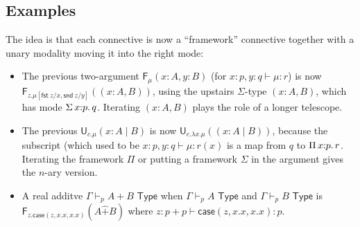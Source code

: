 \documentclass[10pt]{article}
\newcommand\dsd[1]{\ensuremath{\mathsf{#1}}}
\newcommand{\TYPE}{\,\,\mathsf{Type}}
\newcommand\F[2]{\ensuremath{\mathsf{F}_{#1}(#2)}}
\newcommand\U[2]{\ensuremath{\mathsf{U}_{#1}(#2)}}
\newcommand{\case}{\mathsf{case}}
\newcommand{\app}[2]{\ensuremath{#1 \: #2}}
\newcommand{\sigmacl}[3]{\ensuremath{\textnormal{$\Sigma$}\,#1{:}#2.\,#3}}
\newcommand{\fst}[1]{\app{\dsd{fst}}{#1}}
\newcommand{\snd}[1]{\app{\dsd{snd}}{#1}}
\newcommand{\picl}[3]{\ensuremath{\textnormal{$\Pi$}\,#1{:}#2.\,#3}}
\newcommand{\telety}[3]{\ensuremath{(#1{:}#2,#3)}}
\newcommand{\fpity}[3]{\ensuremath{(#1{:}#2 \mid #3)}}
\newcommand{\fsumty}[2]{\ensuremath{#1 \mathbin{\hat{+}} #2}}
\begin{document}
\subsection{Examples}

The idea is that each connective is now a ``framework'' connective
together with a unary modality moving it into the right mode:

\begin{itemize}
\item 
The previous two-argument \F{\mu}{x:A,y:B} (for $x :p, y:q \vdash \mu :
r$) is now \F{z.\mu[\fst z/x,\snd z/y]}{\telety{x}{A}{B}}, using the
upstairs $\Sigma$-type ${\telety{x}{A}{B}}$, which has mode
$\sigmacl{x}{p}{q}$.  Iterating $\telety{x}{A}{B}$ plays the role of a
longer telescope.  

\item 
The previous \U{c.\mu}{x : A \mid B} is now
\U{c.\lambda{x}.{\mu}}{\fpity{x}{A}{B}}, because the subscript (which
used to be $x:p,y:q \vdash \mu : r(x)$ is a map from $q$ to
$\picl{x}{p}{r}$.  Iterating the framework $\Pi$ or putting a framework
$\Sigma$ in the argument gives the $n$-ary version.

\item A real additve $\Gamma \vdash_p A + B \TYPE$ when $\Gamma \vdash_p
  A \TYPE$ and $\Gamma \vdash_p B \TYPE$ is
  \F{z.\case(z,x.x,x.x)}{\fsumty{A}{B}} where
  $z : p + p \vdash \case(z,x.x,x.x) : p$.

\end{itemize}
\end{document}
